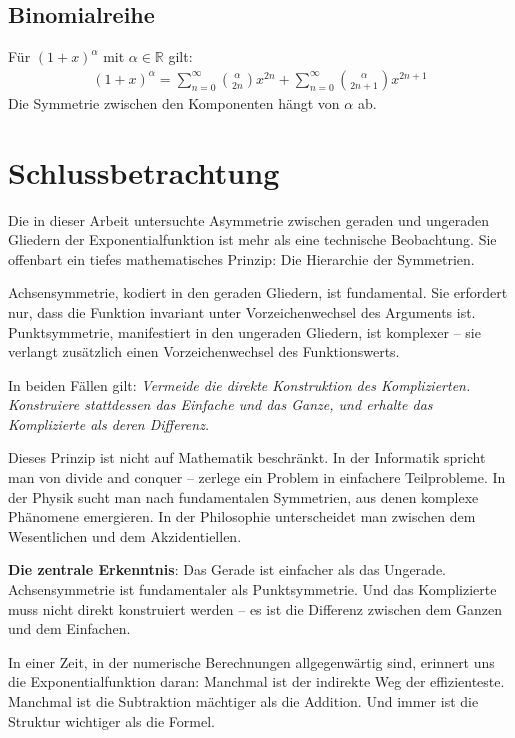 ﻿\documentclass[a4paper,12pt]{article}
\theoremstyle{definition}
\begin{document}
\subsection{Binomialreihe}

Für $(1+x)^\alpha$ mit $\alpha \in \mathbb{R}$ gilt:
\begin{align}
  (1+x)^\alpha
    = \sum_{n=0}^{\infty} \binom{\alpha}{2n} x^{2n}
    + \sum_{n=0}^{\infty} \binom{\alpha}{2n+1} x^{2n+1}
\end{align}
Die Symmetrie zwischen den Komponenten hängt von $\alpha$ ab.

\section{Schlussbetrachtung}

Die in dieser Arbeit untersuchte Asymmetrie zwischen geraden und ungeraden
Gliedern der Exponentialfunktion ist mehr als eine technische Beobachtung.
Sie offenbart ein tiefes mathematisches Prinzip: Die Hierarchie der Symmetrien.

Achsensymmetrie, kodiert in den geraden Gliedern, ist fundamental. Sie
erfordert nur, dass die Funktion invariant unter Vorzeichenwechsel des
Arguments ist. Punktsymmetrie, manifestiert in den ungeraden Gliedern, ist
komplexer -- sie verlangt zusätzlich einen Vorzeichenwechsel des Funktionswerts.

In beiden Fällen gilt: \textit{Vermeide die direkte Konstruktion des
Komplizierten. Konstruiere stattdessen das Einfache und das Ganze, und erhalte
das Komplizierte als deren Differenz.}

Dieses Prinzip ist nicht auf Mathematik beschränkt. In der Informatik spricht
man von \glqq divide and conquer\grqq{} -- zerlege ein Problem in einfachere
Teilprobleme. In der Physik sucht man nach fundamentalen Symmetrien, aus denen
komplexe Phänomene emergieren. In der Philosophie unterscheidet man zwischen
dem Wesentlichen und dem Akzidentiellen.

\textbf{Die zentrale Erkenntnis}: Das Gerade ist einfacher als das Ungerade.
Achsensymmetrie ist fundamentaler als Punktsymmetrie. Und das Komplizierte
muss nicht direkt konstruiert werden -- es ist die Differenz zwischen dem
Ganzen und dem Einfachen.

In einer Zeit, in der numerische Berechnungen allgegenwärtig sind, erinnert
uns die Exponentialfunktion daran: Manchmal ist der indirekte Weg der
effizienteste. Manchmal ist die Subtraktion mächtiger als die Addition. Und
immer ist die Struktur wichtiger als die Formel.
\end{document}
